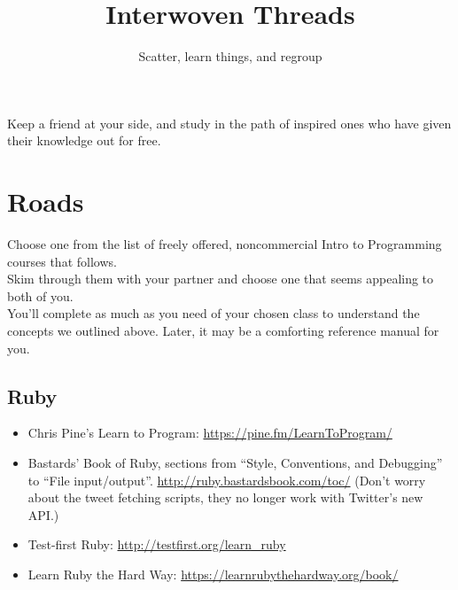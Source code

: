 \documentclass{42-en}
\begin{document}
\title{Interwoven Threads}
\subtitle{Scatter, learn things, and regroup}


\summary
{
	Keep a friend at your side, and study in the path of inspired ones who have given their knowledge out for free. 
}

\maketitle

\tableofcontents



\chapter{Roads}

Choose one from the list of freely offered, noncommercial Intro to Programming courses that follows.\\

Skim through them with your partner and choose one that seems appealing to both of you.\\

You'll complete as much as you need of your chosen class to understand the concepts we outlined above. Later, it may be a comforting reference manual for you.\\

\section{Ruby}

\begin{itemize}

	\item Chris Pine’s Learn to Program: \url{https://pine.fm/LearnToProgram/}
	\item Bastards’ Book of Ruby, sections from “Style, Conventions, and Debugging” to “File input/output”. \url{http://ruby.bastardsbook.com/toc/} (Don’t worry about the tweet fetching scripts, they no longer work with Twitter’s new API.)
	\item Test-first Ruby: \url{http://testfirst.org/learn_ruby}
	\item Learn Ruby the Hard Way: \url{https://learnrubythehardway.org/book/ }

\end{itemize}
\end{document}
